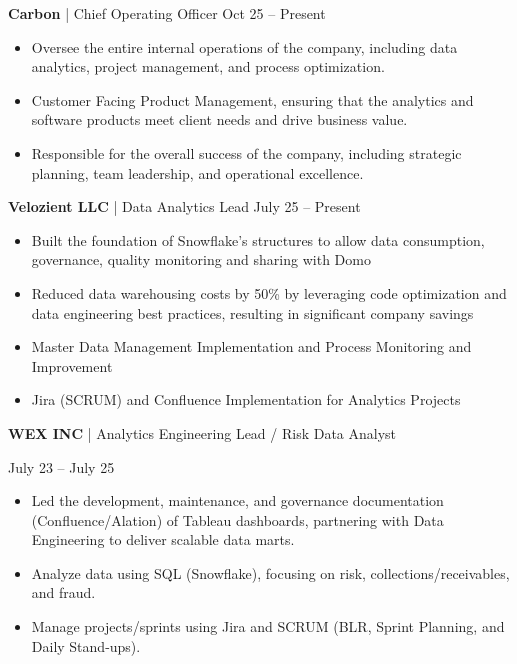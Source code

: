 \documentclass[9pt, letterpaper]{article}
\begin{document}
	\noindent \textbf{Carbon} | Chief Operating Officer \hfill Oct 25 -- Present
	\begin{itemize}[noitemsep, topsep=1pt, leftmargin=1.5em, rightmargin=3.5cm]
		\item Oversee the entire internal operations of the company, including data analytics, project management, and process optimization.
		\item Customer Facing Product Management, ensuring that the analytics and software products meet client needs and drive business value.
		\item Responsible for the overall success of the company, including strategic planning, team leadership, and operational excellence.
	\end{itemize}

	\noindent \textbf{Velozient LLC} | Data Analytics Lead \hfill July 25 -- Present
	\begin{itemize}[noitemsep, topsep=1pt, leftmargin=1.5em, rightmargin=3.5cm]
		\item Built the foundation of Snowflake's structures to allow data consumption, governance, quality monitoring and sharing with Domo
		\item Reduced data warehousing costs by 50\% by leveraging code optimization and data engineering best practices, resulting in significant company savings
		\item Master Data Management Implementation and Process Monitoring and Improvement
		\item Jira (SCRUM) and Confluence Implementation for Analytics Projects
	\end{itemize}
	
	\noindent \begin{minipage}[t]{0.75\textwidth}
		\textbf{WEX INC} | Analytics Engineering Lead / Risk Data Analyst
	\end{minipage}
	\begin{minipage}[t]{0.25\textwidth}
		\raggedleft July 23 -- July 25 
	\end{minipage}
	
	\begin{itemize}[noitemsep, topsep=1pt, leftmargin=1.5em, rightmargin=3.5cm]
		\item Led the development, maintenance, and governance documentation (Confluence/Alation) of Tableau dashboards, partnering with Data Engineering to deliver scalable data marts.
		\item Analyze data using SQL (Snowflake), focusing on risk, collections/receivables, and fraud.
		\item Manage projects/sprints using Jira and SCRUM (BLR, Sprint Planning, and Daily Stand-ups).
	\end{itemize}
	
\end{document}
